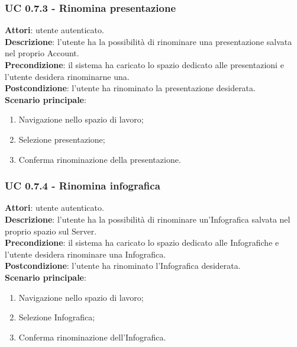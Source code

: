 	\subsubsection{UC 0.7.3 - Rinomina presentazione}{
		\label{uc0.7.3}
		\textbf{Attori}: utente autenticato.	\\
		\textbf{Descrizione}: l'utente ha la possibilità di rinominare una presentazione salvata nel proprio Account. \\
		\textbf{Precondizione}: il sistema ha caricato lo spazio dedicato alle presentazioni e l'utente desidera rinominarne una.	\\
		\textbf{Postcondizione}: l'utente ha rinominato la presentazione desiderata.	\\
		\textbf{Scenario principale}:
		\begin{enumerate}
			\item Navigazione nello spazio di lavoro;
			\item Selezione presentazione;
			\item Conferma rinominazione della presentazione.
		\end{enumerate}
		}
	\subsubsection{UC 0.7.4 - Rinomina infografica}{
		\label{uc0.7.4}
		\textbf{Attori}: utente autenticato.	\\
		\textbf{Descrizione}: l'utente ha la possibilità di rinominare un'Infografica salvata nel proprio spazio sul Server. \\
		\textbf{Precondizione}: il sistema ha caricato lo spazio dedicato alle Infografiche e l'utente desidera rinominare una Infografica.	\\
		\textbf{Postcondizione}: l'utente ha rinominato l'Infografica desiderata.	\\
		\textbf{Scenario principale}:
		\begin{enumerate}
			\item Navigazione nello spazio di lavoro;
			\item Selezione Infografica;
			\item Conferma rinominazione dell'Infografica.
		\end{enumerate}
		}
